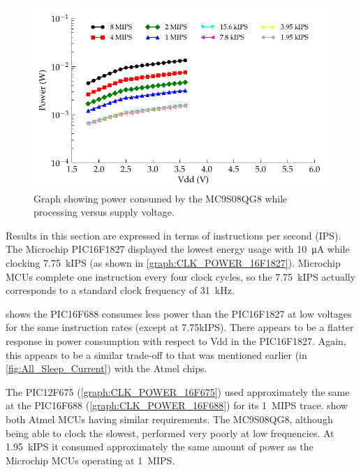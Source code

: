       \begin{figure}
        \centering
        \includegraphics{content/pt1/03-EnergyRequirements/graphics/Graph_MC9S08QG8_Clock_Power}
        \caption{\label{graph:CLK_POWER_MC9S08QG8}Graph showing power consumed by the MC9S08QG8 while processing versus supply voltage.}
      \end{figure}

      Results in this section are expressed in terms of instructions per second (IPS).
      The Microchip PIC16F1827 displayed the lowest energy usage with \SI{10}{\micro\ampere} while clocking \SI{7.75}{\kilo IPS} (as shown in \cref{graph:CLK_POWER_16F1827}).
      Microchip MCUs complete one instruction every four clock cycles, so the \SI{7.75}{\kilo IPS} actually corresponds to a standard clock frequency of \SI{31}{\kilo\hertz}.

       shows the PIC16F688 consumes less power than the PIC16F1827 at low voltages for the same instruction rates (except at 7.75kIPS).
      There appears to be a flatter response in power consumption with respect to Vdd in the PIC16F1827.
      Again, this appears to be a similar trade-off to that was mentioned earlier (in \cref{fig:All_Sleep_Current}) with the Atmel chips.

      The PIC12F675 (\cref{graph:CLK_POWER_16F675}) used approximately the same at the PIC16F688 (\cref{graph:CLK_POWER_16F688}) for its \SI{1}{\mega IPS} trace.
       show both Atmel MCUs having similar requirements.
      The MC9S08QG8, although being able to clock the slowest, performed very poorly at low frequencies.
      At \SI{1.95}{\kilo IPS} it consumed approximately the same amount of power as the Microchip MCUs operating at \SI{1}{\mega IPS}.

